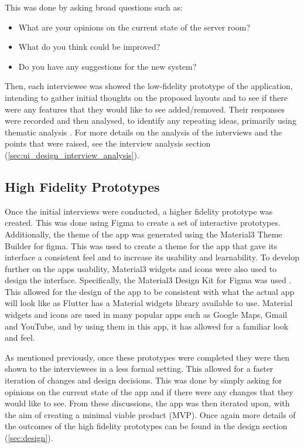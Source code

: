 \documentclass [11pt,a4paper]{article}
\begin{document}
This was done by asking broad questions such as:

\begin{itemize}
    \item What are your opinions on the current state of the server room?
    \item What do you think could be improved?
    \item Do you have any suggestions for the new system?
\end{itemize}

Then, each interviewee was showed the low-fidelity prototype of the application, intending to gather initial thoughts on the proposed layouts and to see if there were any features that they would like to see added/removed. Their responses were recorded and then analysed, to identify any repeating ideas, primarily using thematic analysis \cite{thematicAnal}. For more details on the analysis of the interviews and the points that were raised, see the interview analysis section (\ref{sec:ui_design_interview_analysis}).

\subsection{High Fidelity Prototypes}
\label{sec:high_fidelity_prototypes}
Once the initial interviews were conducted, a higher fidelity prototype was created. This was done using Figma to create a set of interactive prototypes. Additionally, the theme of the app was generated using the Material3 Theme Builder for figma\cite{material3ColourTool}. This was used to create a theme for the app that gave its interface a consistent feel and to increase its usability and learnability. To develop further on the apps usability, Material3 widgets and icons were also used to design the interface. Specifically, the Material3 Design Kit for Figma was used \cite{material3DesignKit}. This allowed for the design of the app to be consistent with what the actual app will look like as Flutter has a Material widgets library available to use. Material widgets and icons are used in many popular apps such as Google Maps, Gmail and YouTube, and by using them in this app, it has allowed for a familiar look and feel. 

As mentioned previously, once these prototypes were completed they were then shown to the interviewees in a less formal setting. This allowed for a faster iteration of changes and design decisions. This was done by simply asking for opinions on the current state of the app and if there were any changes that they would like to see. From these discussions, the app was then iterated upon, with the aim of creating a minimal viable product (MVP). Once again more details of the outcomes of the high fidelity prototypes can be found in the design section (\ref{sec:design}).
\end{document}
